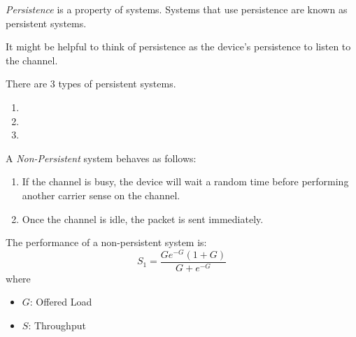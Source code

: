 \begin{definition}[Persistence]\label{def:Persistence}
  \emph{Persistence} is a property of  systems.
  Systems that use persistence are known as persistent systems.

  \begin{remark*}
    It might be helpful to think of persistence as the device's persistence to listen to the channel.
  \end{remark*}

  There are 3 types of persistent systems.
  \begin{enumerate}[noitemsep]
  \item {}
  \item {}
  \item {}
  \end{enumerate}
\end{definition}

\begin{definition}\label{def:Non_Persistent}
  A \emph{Non-Persistent} system behaves as follows:
  \begin{enumerate}[noitemsep]
  \item If the channel is busy, the device will wait a random time before performing another carrier sense on the channel.
  \item Once the channel is idle, the packet is sent immediately.
  \end{enumerate}

  The performance of a non-persistent system is:
  \begin{equation}\label{eq:Non_Persistent_Performance}
    S_{1} = \frac{G e^{-G} (1+G)}{G + e^{-G}}
  \end{equation}
  where
  \begin{itemize}[noitemsep]
  \item $G$: Offered Load
  \item $S$: Throughput
  \end{itemize}
\end{definition}


